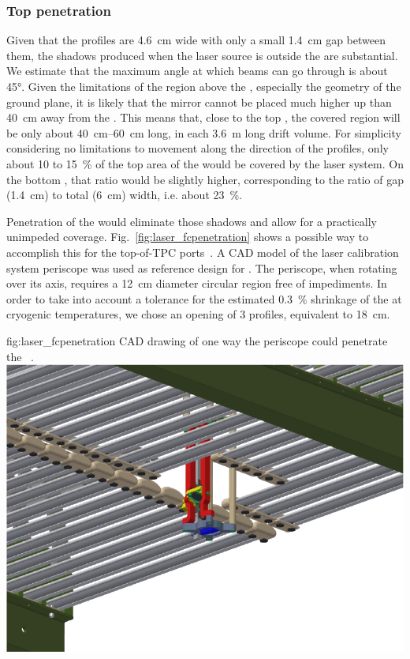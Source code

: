 \subsubsection{Top  penetration}
\label{sec:lasertopfcpen}

Given that the  profiles are \SI{4.6}{\cm} wide with only a small \SI{1.4}{\cm} gap between them, the shadows 
produced when the laser source is outside the  are substantial. We estimate that the maximum angle at which beams can go through is about \ang{45}. Given the limitations of the region above the , especially the geometry of the ground plane, it is likely that the mirror cannot be placed much higher up than \SI{40}{\cm} away from the . This means that, close to the top , the covered region will be only about \SIrange{40}{60}{\cm} long, in each \SI{3.6}{\m} long drift volume. 
For simplicity considering no limitations to movement along the direction of the  profiles, 
only about \num{10} to \SI{15}{\%} of the top area of the  would be covered by the laser system. On the bottom , that ratio would be slightly higher, corresponding to the ratio of gap (\SI{1.4}{\cm}) to total (\SI{6}{\cm}) width, i.e. about \SI{23}{\%}.

Penetration of the  would eliminate those shadows and allow for a practically unimpeded coverage. Fig.~\ref{fig:laser_fcpenetration} shows a possible way to accomplish this for the top-of-TPC ports~\cite{bib:yu2019a}. A CAD model of the  laser calibration system periscope was used as 
reference design for . The  periscope, when rotating over its axis, requires a \SI{12}{\cm} diameter circular region free of impediments. In order to take into account a tolerance for the estimated \SI{0.3}{\%} shrinkage of the  at cryogenic temperatures, we chose an opening of \num{3} profiles, equivalent to \SI{18}{\cm}.

\begin{dunefigure}{fig:laser_fcpenetration}
{CAD drawing of one way the periscope could penetrate the ~\cite{bib:yu2019a}.}
\includegraphics[width=0.8\linewidth]{graphics/laser_fcpenetration.pdf}
\end{dunefigure}

